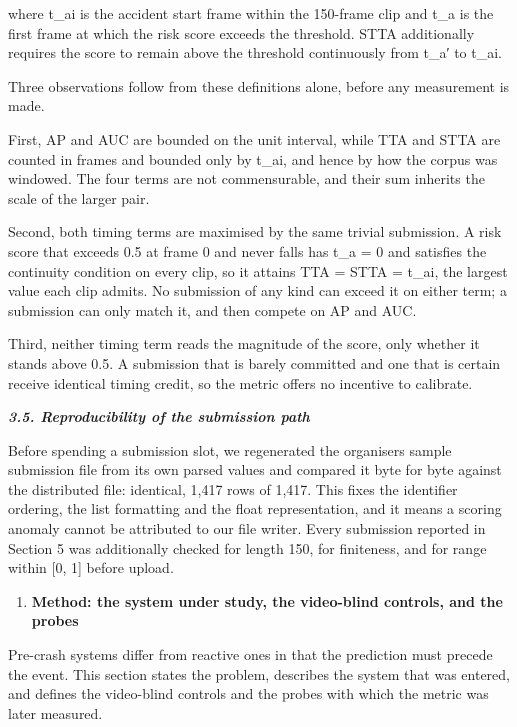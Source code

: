 where t\_ai is the accident start frame within the 150-frame clip and t\_a is the first frame at which the risk score exceeds the threshold. STTA additionally requires the score to remain above the threshold continuously from t\_a′ to t\_ai.

Three observations follow from these definitions alone, before any measurement is made.

First, AP and AUC are bounded on the unit interval, while TTA and STTA are counted in frames and bounded only by t\_ai, and hence by how the corpus was windowed. The four terms are not commensurable, and their sum inherits the scale of the larger pair.

Second, both timing terms are maximised by the same trivial submission. A risk score that exceeds 0.5 at frame 0 and never falls has t\_a = 0 and satisfies the continuity condition on every clip, so it attains TTA = STTA = t\_ai, the largest value each clip admits. No submission of any kind can exceed it on either term; a submission can only match it, and then compete on AP and AUC.

Third, neither timing term reads the magnitude of the score, only whether it stands above 0.5. A submission that is barely committed and one that is certain receive identical timing credit, so the metric offers no incentive to calibrate.

\emph{\textbf{3.5. Reproducibility of the submission path}}

Before spending a submission slot, we regenerated the organisers\textquotesingle{} sample submission file from its own parsed values and compared it byte for byte against the distributed file: identical, 1,417 rows of 1,417. This fixes the identifier ordering, the list formatting and the float representation, and it means a scoring anomaly cannot be attributed to our file writer. Every submission reported in Section 5 was additionally checked for length 150, for finiteness, and for range within {[}0, 1{]} before upload.

\begin{enumerate}
\def\labelenumi{\arabic{enumi}.}
\setcounter{enumi}{2}
\item
  \textbf{Method: the system under study, the video-blind controls, and the probes}
\end{enumerate}

Pre-crash systems differ from reactive ones in that the prediction must precede the event. This section states the problem, describes the system that was entered, and defines the video-blind controls and the probes with which the metric was later measured.

